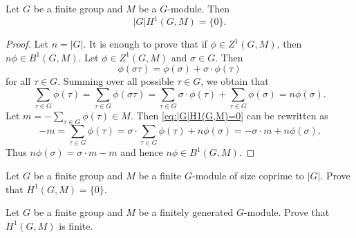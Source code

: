 \begin{theorem}
    Let $G$ be a finite group and $M$ be a $G$-module. 
    Then 
    \[
    |G|H^1(G,M)=\{0\}.
    \]
\end{theorem}

\begin{proof}
    Let $n=|G|$. It is enough to prove that 
    if $\phi\in Z^1(G,M)$, then $n\phi\in B^1(G,M)$. Let $\phi\in Z^1(G,M)$ and 
    $\sigma\in G$. Then 
    \[
    \phi(\sigma\tau)=\phi(\sigma)+\sigma\cdot\phi(\tau)
    \]
    for all $\tau\in G$. Summing over all possible $\tau\in G$, we obtain that 
    \begin{equation}
        \label{eq:|G|H1(G,M)=0}    
        \sum_{\tau\in G}\phi(\tau)=\sum_{\tau\in G}\phi(\sigma\tau)
        =\sum_{\tau\in G}\sigma\cdot\phi(\tau)+\sum_{\tau\in G}\phi(\sigma)=n\phi(\sigma).
    \end{equation}
    Let $m=-\sum_{\tau\in G}\phi(\tau)\in M$. Then 
    \eqref{eq:|G|H1(G,M)=0} can be rewritten as 
    \[
    -m=\sum_{\tau\in G}\phi(\tau)=\sigma\cdot \sum_{\tau\in G}\phi(\tau)+n\phi(\sigma)
    =-\sigma\cdot m+n\phi(\sigma).
    \]
    Thus $n\phi(\sigma)=\sigma\cdot m-m$ and hence $n\phi\in B^1(G,M)$.  
\end{proof}

\begin{exercise}
    Let $G$ be a finite group and 
    $M$ be a finite $G$-module of size coprime to $|G|$. Prove that 
    $H^1(G,M)=\{0\}$. 
\end{exercise}

\begin{exercise}
    Let $G$ be a finite group and 
    $M$ be a finitely generated $G$-module. Prove that
    $H^1(G,M)$ is finite.
\end{exercise}